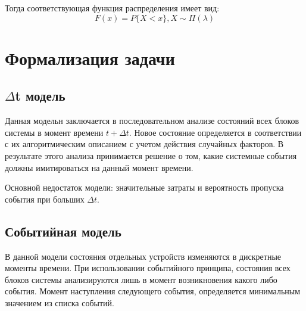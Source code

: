 Тогда соответствующая функция распределения имеет вид:
\begin{equation}
    F(x) = P\{X < x\}, X \sim \Pi(\lambda)
\end{equation}

\section{Формализация задачи}

\subsection{$\Delta$t модель}

Данная модельн заключается в последовательном анализе состояний всех блоков системы в момент времени $t + \Delta t$. Новое состояние определяется в соответствии с их алгоритмическим описанием с учетом действия случайных факторов. В результате этого анализа принимается решение о том, какие системные события должны имитироваться на данный момент времени. 

Основной недостаток модели: значительные затраты и вероятность пропуска события при больших $\Delta t$.

\subsection{Событийная модель}

В данной модели состояния отдельных устройств изменяются в дискретные моменты времени. При использовании событийного принципа, состояния всех блоков системы анализируются лишь в момент возникновения какого либо события. Момент наступления следующего события, определяется минимальным значением из списка событий.